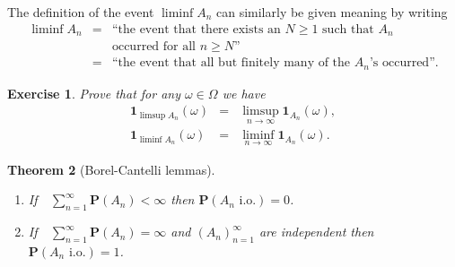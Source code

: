 \documentclass[12pt]{article}
\newtheorem{thm}{Theorem}[section]
\newtheorem{exercise}[thm]{Exercise}
\newcommand{\prob}{\mathbf{P}}
\newcommand{\ind}{\textbf{1}}
\theoremstyle{example}
\begin{document}
The definition of the event $\liminf A_n$ can similarly be given meaning by writing
\begin{eqnarray*}
\liminf A_n &=& \textrm{``the event that there exists an $N\ge 1$ such that $A_n$ }
\\ &  & \textrm{occurred for all $n\ge N$''} \\ &=& \textrm{``the event that all but finitely many of the $A_n$'s occurred''.}
\end{eqnarray*}

\begin{exercise}
Prove that for any $\omega \in \Omega$ we have
\begin{eqnarray*}
\ind_{\limsup A_n}(\omega) &=& \limsup_{n\to\infty} \ind_{A_n}(\omega), \\
\ind_{\liminf A_n}(\omega) &=& \liminf_{n\to\infty} \ind_{A_n}(\omega).
\end{eqnarray*}
\end{exercise}

\begin{thm}[Borel-Cantelli lemmas] \ 
\renewcommand{\labelenumi}{(\roman{enumi})}
\begin{enumerate}
\item If\ \ $\sum_{n=1}^\infty \prob(A_n) < \infty$ then $\prob(A_n\textrm{ i.o.}) = 0$.
\item If\ \ $\sum_{n=1}^\infty \prob(A_n) = \infty$ and $(A_n)_{n=1}^\infty$ are independent then $\prob(A_n\textrm{ i.o.}) = 1$.
\end{enumerate}
\end{thm}
\end{document}

